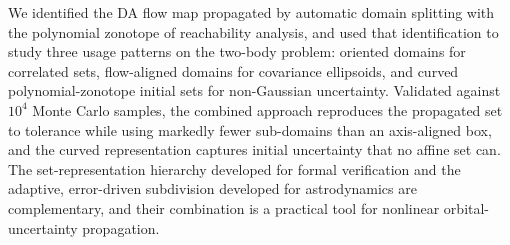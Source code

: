 \documentclass[11pt]{article}
\begin{document}
We identified the DA flow map propagated by automatic domain splitting with the
polynomial zonotope of reachability analysis, and used that identification to
study three usage patterns on the two-body problem: oriented domains for
correlated sets, flow-aligned domains for covariance ellipsoids, and curved
polynomial-zonotope initial sets for non-Gaussian uncertainty. Validated against
$10^4$ Monte Carlo samples, the combined approach reproduces the propagated set
to tolerance while using markedly fewer sub-domains than an axis-aligned box, and
the curved representation captures initial uncertainty that no affine set can.
The set-representation hierarchy developed for formal verification and the
adaptive, error-driven subdivision developed for astrodynamics are complementary,
and their combination is a practical tool for nonlinear orbital-uncertainty
propagation.



\end{document}
